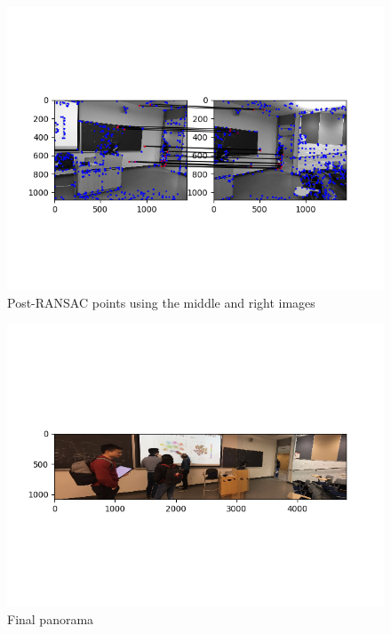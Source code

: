 \documentclass[10pt]{article}
\begin{document}
	\begin{figure}[h]
		\caption{Post-RANSAC points using the middle and right images}
		\centering
		\includegraphics{postranMR.png}
	\end{figure}
	

	\begin{figure}[h]
		\caption{Final panorama}
		\centering
		\includegraphics{mosaic.png}
	\end{figure}
\end{document}
